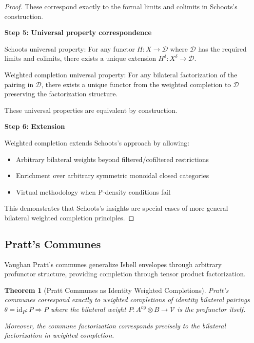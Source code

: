 \documentclass[11pt]{article}
\theoremstyle{plain}
\newtheorem{theorem}{Theorem}[section]
\theoremstyle{definition}
\theoremstyle{remark}
\newcommand{\V}{\mathcal{V}}
\newcommand{\op}{\mathrm{op}}
\begin{document}
\begin{proof}
These correspond exactly to the formal limits and colimits in Schoots's construction.

\textbf{Step 5: Universal property correspondence}

Schoots universal property: For any functor $H : X \to \mathcal{D}$ where $\mathcal{D}$ has the required limits and colimits, there exists a unique extension $H^{\delta} : X^{\delta} \to \mathcal{D}$.

Weighted completion universal property: For any bilateral factorization of the pairing in $\mathcal{D}$, there exists a unique functor from the weighted completion to $\mathcal{D}$ preserving the factorization structure.

These universal properties are equivalent by construction.

\textbf{Step 6: Extension}

Weighted completion extends Schoots's approach by allowing:
\begin{itemize}
\item Arbitrary bilateral weights beyond filtered/cofiltered restrictions
\item Enrichment over arbitrary symmetric monoidal closed categories
\item Virtual methodology when P-density conditions fail
\end{itemize}

This demonstrates that Schoots's insights are special cases of more general bilateral weighted completion principles.
\end{proof}

\subsection{Pratt's Communes}

Vaughan Pratt's communes \cite{pratt2010communes} generalize Isbell envelopes through arbitrary profunctor structure, providing completion through tensor product factorization.

\begin{theorem}[Pratt Communes as Identity Weighted Completions]\label{thm:pratt-correspondence}
Pratt's communes correspond exactly to weighted completions of identity bilateral pairings $\theta = \text{id}_P : P \Rightarrow P$ where the bilateral weight $P : A^{\op} \otimes B \to \V$ is the profunctor itself.

Moreover, the commune factorization corresponds precisely to the bilateral factorization in weighted completion.
\end{theorem}
\end{document}
